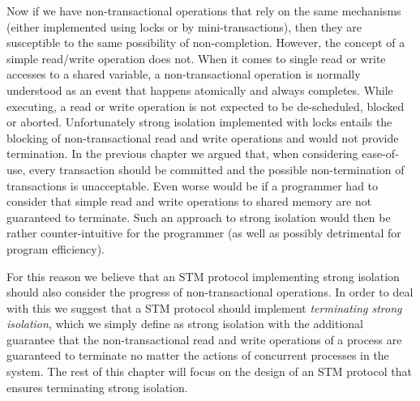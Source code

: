 Now if we have non-transactional operations that rely on the same mechanisms
(either implemented using locks or by mini-transactions), then they are susceptible
to the same possibility of non-completion.
However, the concept of a simple read/write operation does not.
When it  comes to single read or  write accesses  to  a shared
variable, a  non-transactional operation is normally understood  as an
event  that  happens   atomically  and always  completes.
While executing, a  read  or write  operation   is  not 
expected  to  be de-scheduled, blocked or aborted.  
Unfortunately   strong
isolation  implemented with  locks  entails the blocking  
of non-transactional read and write operations and would not provide termination.
In the previous chapter we argued that, when considering ease-of-use, 
every transaction should be committed and the
possible non-termination of transactions is unacceptable.
Even worse would be if a programmer had to consider that simple
read and write operations to shared memory are not guaranteed to terminate.
Such an approach to strong isolation would then be rather counter-intuitive for the 
programmer (as well as possibly detrimental for program efficiency).

For this reason we believe that an STM protocol implementing strong
isolation should also consider the progress of non-transactional operations.
In order to deal with this we suggest that a STM protocol should implement
\emph{terminating strong isolation}, which we simply define as strong isolation
with the additional guarantee that the non-transactional read and write
operations of a process are guaranteed to terminate no matter the actions of
concurrent processes in the system.
The rest of this chapter will focus on the design of an STM protocol
that ensures terminating strong isolation.








% 





